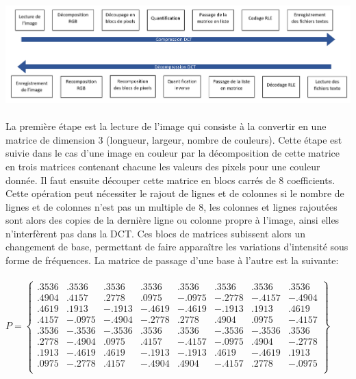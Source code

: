 \documentclass[12pt]{article}
\begin{document}
\paragraph{}
\begin{center}
\includegraphics[scale=0.2]{schema_dct_new.png} %
\end{center}
\paragraph{}
La première étape est la lecture de l’image qui consiste à la convertir en une matrice de dimension 3 (longueur, largeur, nombre de couleurs). Cette étape est suivie dans le cas d’une image en couleur par la décomposition de cette matrice en trois matrices contenant chacune les valeurs des pixels pour une couleur donnée. Il faut ensuite découper cette matrice en blocs carrés de 8 coefficients. Cette opération peut nécessiter le rajout de lignes et de colonnes si le nombre de lignes et de colonnes n’est pas un multiple de 8, les colonnes et lignes rajoutées sont alors des copies de la dernière ligne ou colonne propre à l’image, ainsi elles n’interfèrent pas dans la DCT. Ces blocs de matrices subissent alors un changement de base, permettant de faire apparaître les variations d’intensité sous forme de fréquences. La matrice de passage d’une base à l’autre est la suivante:
\paragraph{}
\begin{center}
$P=
\begin{Bmatrix}

.3536& .3536& .3536& .3536& .3536& .3536& .3536& .3536 \\
.4904& .4157& .2778& .0975& -.0975& -.2778& -.4157& -.4904 \\
.4619& .1913& -.1913& -.4619& -.4619& -.1913& .1913& .4619 \\
.4157& -.0975& -.4904& -.2778 & .2778& .4904& .0975& -.4157 \\
.3536& -.3536& -.3536& .3536& .3536& -.3536& -.3536& .3536 \\
.2778& -.4904& .0975& .4157& -.4157& -.0975& .4904& -.2778 \\
.1913& -.4619& .4619& -.1913& -.1913& .4619& -.4619& .1913 \\
.0975& -.2778& .4157& -.4904& .4904& -.4157& .2778& -.0975 \\

\end{Bmatrix}
$
\end{center}
\end{document}
